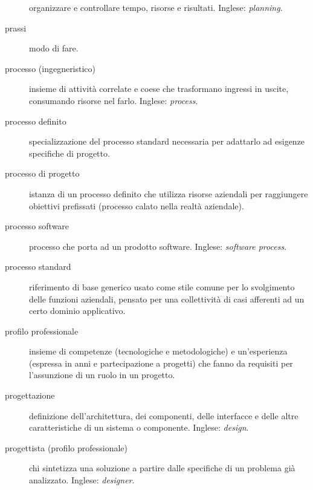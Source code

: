 \documentclass[a4paper]{article}
\begin{document}
\begin{description}
			organizzare e controllare tempo, risorse e risultati. Inglese: \emph{planning}.
			
	\item[prassi] 

			modo di fare.
			
	\item[processo (ingegneristico)] 

			insieme di attività correlate e coese che trasformano ingressi in uscite, consumando risorse nel farlo. Inglese: \emph{process}.
			
	\item[processo definito] 

			specializzazione del processo standard necessaria per adattarlo ad esigenze specifiche di progetto.
			
	\item[processo di progetto] 

			istanza di un processo definito che utilizza risorse aziendali per raggiungere obiettivi prefissati (processo calato nella realtà aziendale).
			
	\item[processo software] 

			processo che porta ad un prodotto software. Inglese: \emph{software process}.
			
	\item[processo standard] 

			riferimento di base generico usato come stile comune per lo svolgimento delle funzioni aziendali, pensato per una collettività di casi afferenti ad un certo dominio applicativo.
			
	\item[profilo professionale] 

			insieme di competenze (tecnologiche e metodologiche) e un'esperienza (espressa in anni e partecipazione a progetti) che fanno da requisiti per l'assunzione di un ruolo in un progetto.
			
	\item[progettazione] 

			definizione dell'architettura, dei componenti, delle interfacce e delle altre caratteristiche di un sistema o componente. Inglese: \emph{design}.
			
	\item[progettista (profilo professionale)] 

			chi sintetizza una soluzione a partire dalle specifiche di un problema già analizzato. Inglese: \emph{designer}.
			

\end{description}
\end{document}
